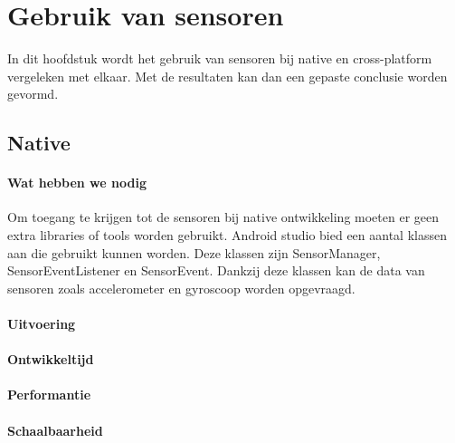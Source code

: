 
\chapter{Gebruik van sensoren}%
\label{ch:sensoren}

In dit hoofdstuk wordt het gebruik van sensoren bij native en cross-platform vergeleken met elkaar. 
Met de resultaten kan dan een gepaste conclusie worden gevormd.

\section{Native}
\subsubsection{Wat hebben we nodig}
Om toegang te krijgen tot de sensoren bij native ontwikkeling moeten er geen extra libraries of tools worden gebruikt.
Android studio bied een aantal klassen aan die gebruikt kunnen worden. Deze klassen zijn SensorManager, 
SensorEventListener en SensorEvent. Dankzij deze klassen kan de data van sensoren zoals accelerometer en 
gyroscoop worden opgevraagd.

\subsubsection{Uitvoering}



\subsubsection{Ontwikkeltijd}



\subsubsection{Performantie}



\subsubsection{Schaalbaarheid}

